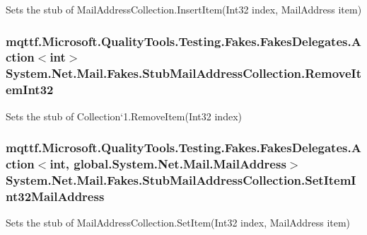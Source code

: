 Sets the stub of Mail\-Address\-Collection.\-Insert\-Item(\-Int32 index, Mail\-Address item)

\hypertarget{class_system_1_1_net_1_1_mail_1_1_fakes_1_1_stub_mail_address_collection_adeb0e6eedb7affe8eac2330f23a763bc}{
\subsubsection[{Remove\-Item\-Int32}]{\setlength{\rightskip}{0pt plus 5cm}mqttf.\-Microsoft.\-Quality\-Tools.\-Testing.\-Fakes.\-Fakes\-Delegates.\-Action$<$int$>$ System.\-Net.\-Mail.\-Fakes.\-Stub\-Mail\-Address\-Collection.\-Remove\-Item\-Int32}}\label{class_system_1_1_net_1_1_mail_1_1_fakes_1_1_stub_mail_address_collection_adeb0e6eedb7affe8eac2330f23a763bc}


Sets the stub of Collection`1.Remove\-Item(\-Int32 index)

\hypertarget{class_system_1_1_net_1_1_mail_1_1_fakes_1_1_stub_mail_address_collection_a53e0e5e959b6e4d0ec72f97f8a484e3e}{
\subsubsection[{Set\-Item\-Int32\-Mail\-Address}]{\setlength{\rightskip}{0pt plus 5cm}mqttf.\-Microsoft.\-Quality\-Tools.\-Testing.\-Fakes.\-Fakes\-Delegates.\-Action$<$int, global.\-System.\-Net.\-Mail.\-Mail\-Address$>$ System.\-Net.\-Mail.\-Fakes.\-Stub\-Mail\-Address\-Collection.\-Set\-Item\-Int32\-Mail\-Address}}\label{class_system_1_1_net_1_1_mail_1_1_fakes_1_1_stub_mail_address_collection_a53e0e5e959b6e4d0ec72f97f8a484e3e}


Sets the stub of Mail\-Address\-Collection.\-Set\-Item(\-Int32 index, Mail\-Address item)

